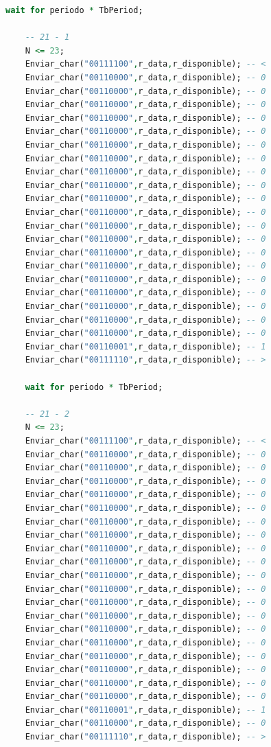 \begin{lstlisting}[language = vhdl,caption=Testbench del módulo enclavamiento,label={lst:test_separador}]
	wait for periodo * TbPeriod;

	-- 21 - 1
	N <= 23; 	
	Enviar_char("00111100",r_data,r_disponible); -- < 	
	Enviar_char("00110000",r_data,r_disponible); -- 0 	
	Enviar_char("00110000",r_data,r_disponible); -- 0
 	Enviar_char("00110000",r_data,r_disponible); -- 0 	
	Enviar_char("00110000",r_data,r_disponible); -- 0
	Enviar_char("00110000",r_data,r_disponible); -- 0 	
	Enviar_char("00110000",r_data,r_disponible); -- 0
	Enviar_char("00110000",r_data,r_disponible); -- 0 	
	Enviar_char("00110000",r_data,r_disponible); -- 0
	Enviar_char("00110000",r_data,r_disponible); -- 0 	
	Enviar_char("00110000",r_data,r_disponible); -- 0
	Enviar_char("00110000",r_data,r_disponible); -- 0 	
	Enviar_char("00110000",r_data,r_disponible); -- 0
	Enviar_char("00110000",r_data,r_disponible); -- 0 	
	Enviar_char("00110000",r_data,r_disponible); -- 0
	Enviar_char("00110000",r_data,r_disponible); -- 0 	
	Enviar_char("00110000",r_data,r_disponible); -- 0
	Enviar_char("00110000",r_data,r_disponible); -- 0 	
	Enviar_char("00110000",r_data,r_disponible); -- 0
	Enviar_char("00110000",r_data,r_disponible); -- 0 	
	Enviar_char("00110000",r_data,r_disponible); -- 0
	Enviar_char("00110001",r_data,r_disponible); -- 1 	
	Enviar_char("00111110",r_data,r_disponible); -- >

	wait for periodo * TbPeriod;

	-- 21 - 2
	N <= 23; 	
	Enviar_char("00111100",r_data,r_disponible); -- < 	
	Enviar_char("00110000",r_data,r_disponible); -- 0 	
	Enviar_char("00110000",r_data,r_disponible); -- 0
 	Enviar_char("00110000",r_data,r_disponible); -- 0 	
	Enviar_char("00110000",r_data,r_disponible); -- 0
	Enviar_char("00110000",r_data,r_disponible); -- 0 	
	Enviar_char("00110000",r_data,r_disponible); -- 0
	Enviar_char("00110000",r_data,r_disponible); -- 0 	
	Enviar_char("00110000",r_data,r_disponible); -- 0
	Enviar_char("00110000",r_data,r_disponible); -- 0 	
	Enviar_char("00110000",r_data,r_disponible); -- 0
	Enviar_char("00110000",r_data,r_disponible); -- 0 	
	Enviar_char("00110000",r_data,r_disponible); -- 0
	Enviar_char("00110000",r_data,r_disponible); -- 0 	
	Enviar_char("00110000",r_data,r_disponible); -- 0
	Enviar_char("00110000",r_data,r_disponible); -- 0 	
	Enviar_char("00110000",r_data,r_disponible); -- 0
	Enviar_char("00110000",r_data,r_disponible); -- 0 	
	Enviar_char("00110000",r_data,r_disponible); -- 0
	Enviar_char("00110000",r_data,r_disponible); -- 0 	
	Enviar_char("00110001",r_data,r_disponible); -- 1
	Enviar_char("00110000",r_data,r_disponible); -- 0 	
	Enviar_char("00111110",r_data,r_disponible); -- >


\end{lstlisting}
